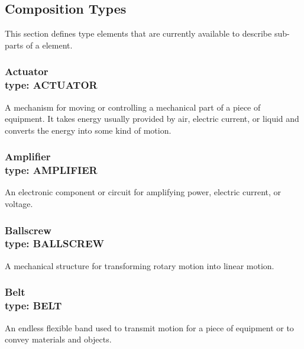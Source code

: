 \subsection{Composition Types} \label{sec:Composition Types}


This section defines  type elements that are currently available to describe sub-parts of a  element.


\subsubsection[Actuator]{Actuator \\ {\small type: ACTUATOR}}




A mechanism for moving or controlling a mechanical part of a piece of equipment.   
 It takes energy usually provided by air, electric current, or liquid and converts the energy into some kind of motion. 



\subsubsection[Amplifier]{Amplifier \\ {\small type: AMPLIFIER}}
\label{sec:Amplifier}



An electronic component or circuit for amplifying power, electric current, or voltage.



\subsubsection[Ballscrew]{Ballscrew \\ {\small type: BALLSCREW}}
\label{sec:Ballscrew}



A mechanical structure for transforming rotary motion into linear motion.



\subsubsection[Belt]{Belt \\ {\small type: BELT}}
\label{sec:Belt}



An endless flexible band used to transmit motion for a piece of equipment or to convey materials and objects.



